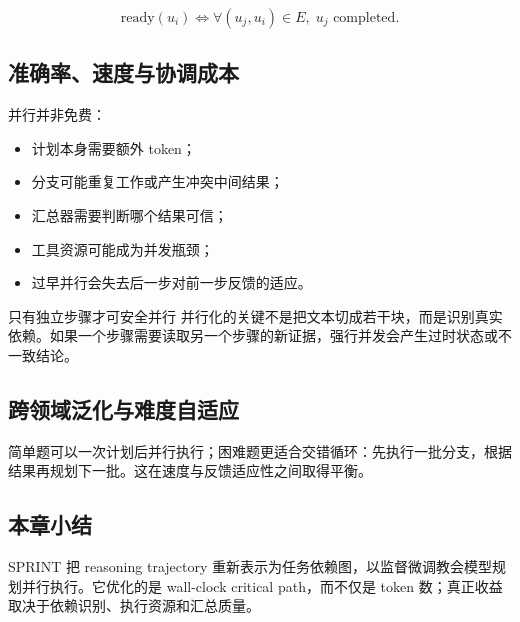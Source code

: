 $$
\mathrm{ready}(u_i)\iff \forall (u_j,u_i)\in E,\;u_j\text{ completed}.
$$


\subsection{准确率、速度与协调成本}

并行并非免费：

\begin{itemize}
    \item 计划本身需要额外 token；
    \item 分支可能重复工作或产生冲突中间结果；
    \item 汇总器需要判断哪个结果可信；
    \item 工具资源可能成为并发瓶颈；
    \item 过早并行会失去后一步对前一步反馈的适应。
\end{itemize}

\begin{importantbox}{只有独立步骤才可安全并行}
并行化的关键不是把文本切成若干块，而是识别真实依赖。如果一个步骤需要读取另一个步骤的新证据，强行并发会产生过时状态或不一致结论。
\end{importantbox}

\subsection{跨领域泛化与难度自适应}



简单题可以一次计划后并行执行；困难题更适合交错循环：先执行一批分支，根据结果再规划下一批。这在速度与反馈适应性之间取得平衡。


\subsection{本章小结}

SPRINT 把 reasoning trajectory 重新表示为任务依赖图，以监督微调教会模型规划并行执行。它优化的是 wall-clock critical path，而不仅是 token 数；真正收益取决于依赖识别、执行资源和汇总质量。

